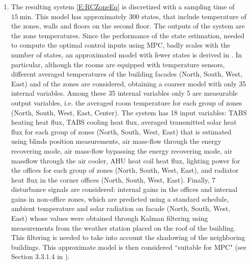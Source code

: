 {\begin{enumerate}
Equation \eqref{E:RCfluxes} for the heat flux is obtained by modeling:
	\begin{itemize}
		\item heat exchange associated with the building hull (except for windows), both conductive and radiative part;
		\item  heat flux to each thermally activated building system (TABS), i.e. pipes buried in the concrete slabs of the floors carrying hot/cold water;
		\item heat flux through the windows in three different parts: radiation due to elements directly in contact with the zone air, conduction through the window, and absorption of the solar radiation through the window;
		\item convection due to internal gains due to occupants, appliances and lighting;
		\item the effects of the AHU.
	\end{itemize}
	\item The resulting system \eqref{E:RCZoneEq} is discretized with a sampling time of $15\ \mathrm{min}$. This model has approximately 300 states, that include temperature of the zones, walls and floors on the second floor. The outputs of the system are the zone temperatures. Since the performance of the state estimation, needed to compute the optimal control inputs using MPC, badly scales with the number of states, an approximated model with fewer states is derived in \cite{SturzeneggerTR}. In particular, although the rooms are equipped with temperature sensors, different averaged temperatures of the building facades (North, South, West, East) and of the zones are considered, obtaining a coarser model with only 35 internal variables. Among these 35 internal variables only 5 are measurable output variables, i.e. the averaged room temperature for each group of zones (North, South, West, East, Center). The system has 18 input variables: TABS heating heat flux, TABS cooling heat flux, averaged transmitted solar heat flux for each group of zones (North, South, West, East) that is estimated using blinds position measurements, air mass-flow through the energy recovering mode, air mass-flow bypassing the energy recovering mode, air massflow through the air cooler, AHU heat coil heat flux, lighting power for the offices for each group of zones (North, South, West, East), and radiator heat flux in the corner offices (North, South, West, East). Finally, 7 disturbance signals are considered: internal gains in the offices and internal gains in non-office zones, which are predicted using a standard schedule, ambient temperature and solar radiation on facade (North, South, West, East) whose values were obtained through Kalman filtering using measurements from the weather station placed on the roof of the building. This filtering is needed to take into account the shadowing of the neighboring buildings. This approximate model is then considered ``suitable for MPC" (see Section 3.3.1.4 in \cite{SturzeneggerTR}).
\end{enumerate}}
	
